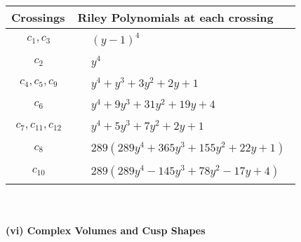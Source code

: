 \documentclass[1p]{elsarticle_modified}
\theoremstyle{definition}
\begin{document}
\begin{tabular}{m{50pt}|m{274pt}}
Crossings & \hspace{64pt}Riley Polynomials at each crossing \\
\hline $$\begin{aligned}c_{1},c_{3}\end{aligned}$$&$\begin{aligned}
&(y-1)^4
\end{aligned}$\\
\hline $$\begin{aligned}c_{2}\end{aligned}$$&$\begin{aligned}
&y^4
\end{aligned}$\\
\hline $$\begin{aligned}c_{4},c_{5},c_{9}\end{aligned}$$&$\begin{aligned}
&y^4+y^3+3 y^2+2 y+1
\end{aligned}$\\
\hline $$\begin{aligned}c_{6}\end{aligned}$$&$\begin{aligned}
&y^4+9 y^3+31 y^2+19 y+4
\end{aligned}$\\
\hline $$\begin{aligned}c_{7},c_{11},c_{12}\end{aligned}$$&$\begin{aligned}
&y^4+5 y^3+7 y^2+2 y+1
\end{aligned}$\\
\hline $$\begin{aligned}c_{8}\end{aligned}$$&$\begin{aligned}
&289(289 y^4+365 y^3+155 y^2+22 y+1)
\end{aligned}$\\
\hline $$\begin{aligned}c_{10}\end{aligned}$$&$\begin{aligned}
&289(289 y^4-145 y^3+78 y^2-17 y+4)
\end{aligned}$\\
\hline
\end{tabular}\\~\\
\newpage\flushleft \textbf{(vi) Complex Volumes and Cusp Shapes}
\end{document}
